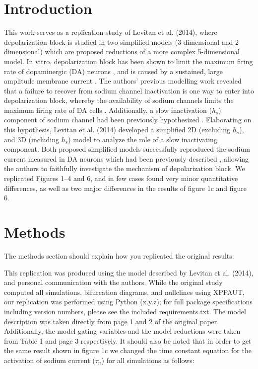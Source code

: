 \section{Introduction}

This work serves as a replication study of Levitan et al. (2014), where depolarization block is studied in two simplified models (3-dimensional and 2-dimensional) which are proposed reductions of a more complex 5-dimensional model. In vitro, depolarization block has been shown to limit the maximum firing rate of dopaminergic (DA) neurons \supercite{Richards1997}, and is caused by a sustained, large amplitude membrane current \supercite{Bianchi2012}. The authors’ previous modelling work revealed that a failure to recover from sodium channel inactivation is one way to enter into depolarization block, whereby the availability of sodium channels limits the maximum firing rate of DA cells \supercite{Levitan2014}. Additionally, a slow inactivation ($h_{s}$) component of sodium channel had been previously hypothesized \supercite{Ding2011}. Elaborating on this hypothesis, Levitan et al. (2014) developed a simplified 2D (excluding $h_{s}$), and 3D (including $h_{s}$) model to analyze the role of a slow inactivating component. Both proposed simplified models successfully reproduced the sodium current measured in DA neurons which had been previously described \supercite{Seutin2010}, allowing the authors to faithfully investigate the mechanism of depolarization block. We replicated Figures 1–4 and 6, and in few cases found very minor quantitative differences, as well as two major differences in the results of figure 1c and figure 6.

\section{Methods}

The methods section should explain how you replicated the original results:

This replication was produced using the model described by Levitan et al. (2014), and personal communication with the authors. While the original study computed all simulations, bifurcation diagrams, and nullclines using XPPAUT, our replication was performed using Python (x.y.z); for full package specifications including version numbers, please see the included requirements.txt. The model description was taken directly from page 1 and 2 of the original paper. Additionally, the model gating variables and the model reductions were taken from Table 1 and page 3 respectively. It should also be noted that in order to get the same result shown in figure 1c we changed the time constant equation for the activation of sodium current ($\tau_{n}$) for all simulations as follows: 
 
